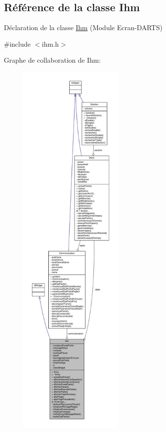 \hypertarget{class_ihm}{}\subsection{Référence de la classe Ihm}
\label{class_ihm}


Déclaration de la classe \hyperlink{class_ihm}{Ihm} (Module Ecran-\/\+D\+A\+R\+TS)  




{\ttfamily \#include $<$ihm.\+h$>$}



Graphe de collaboration de Ihm\+:
\nopagebreak
\begin{figure}[H]
\begin{center}
\leavevmode
\includegraphics[height=550pt]{class_ihm__coll__graph}
\end{center}
\end{figure}

